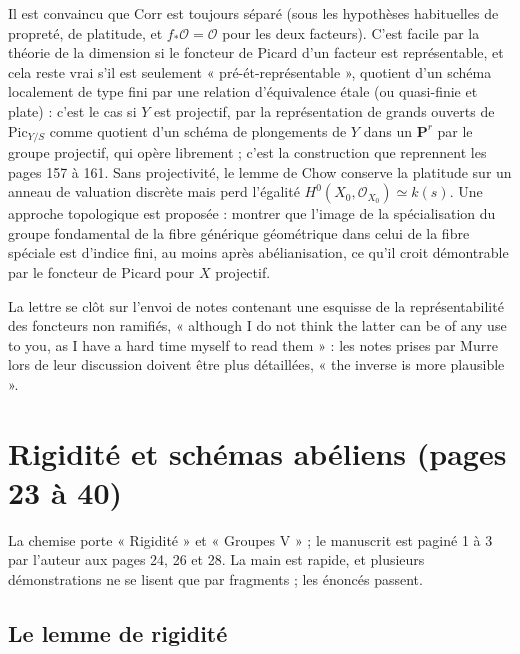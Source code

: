 \documentclass[11pt,a4paper]{article}
\begin{document}
Il est convaincu que $\mathrm{Corr}$ est toujours séparé (sous les hypothèses
habituelles de propreté, de platitude, et $f_*\mathcal{O} = \mathcal{O}$ pour
les deux facteurs). C'est facile par la théorie de la dimension si le foncteur
de Picard d'un facteur est représentable, et cela reste vrai s'il est
seulement « pré-ét-représentable », quotient d'un schéma localement de type fini
par une relation d'équivalence étale (ou quasi-finie et plate) : c'est le cas
si $Y$ est projectif, par la représentation de grands ouverts de
$\mathrm{Pic}_{Y/S}$ comme quotient d'un schéma de plongements de $Y$ dans un
$\mathbf{P}^r$ par le groupe projectif, qui opère librement ; c'est la
construction que reprennent les pages 157 à 161. Sans projectivité, le lemme de
Chow conserve la platitude sur un anneau de valuation discrète mais perd
l'égalité $H^0(X_0, \mathcal{O}_{X_0}) \simeq k(s)$. Une approche topologique
est proposée : montrer que l'image de la spécialisation du groupe fondamental
de la fibre générique géométrique dans celui de la fibre spéciale est d'indice
fini, au moins après abélianisation, ce qu'il croit démontrable par le foncteur
de Picard pour $X$ projectif.

La lettre se clôt sur l'envoi de notes contenant une esquisse de la
représentabilité des foncteurs non ramifiés, « although I do not think the
latter can be of any use to you, as I have a hard time myself to read them » :
les notes prises par Murre lors de leur discussion doivent être plus
détaillées, « the inverse is more plausible ».

\section*{Rigidité et schémas abéliens (pages 23 à 40)}

La chemise porte « Rigidité » et « Groupes V » ; le manuscrit est paginé 1 à 3
par l'auteur aux pages 24, 26 et 28. La main est rapide, et plusieurs
démonstrations ne se lisent que par fragments ; les énoncés passent.

\subsection*{Le lemme de rigidité}
\end{document}
